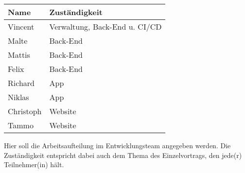 \begin{tabular}{ll}
 \rowcolor[HTML]{E7E7E7} 
 \textbf{Name} & \textbf{Zuständigkeit} \\ \hline
 Vincent & Verwaltung, Back-End u. CI/CD \\ 
 \rowcolor[HTML]{E7E7E7} 
 Malte & Back-End \\ 
 Mattis & Back-End \\ 
 \rowcolor[HTML]{E7E7E7}
 Felix & Back-End\\ 
 Richard & App\\ 
 \rowcolor[HTML]{E7E7E7}
 Niklas &  App \\ 
 Christoph & Website \\ 
 \rowcolor[HTML]{E7E7E7}
 Tammo & Website \\ 
\end{tabular}

\bigskip

\begin{tcolorbox}
Hier soll die Arbeitsaufteilung im Entwicklungsteam angegeben werden. Die Zuständigkeit entspricht dabei auch dem Thema des Einzelvortrags, den jede(r) Teilnehmer(in) hält.
\end{tcolorbox}